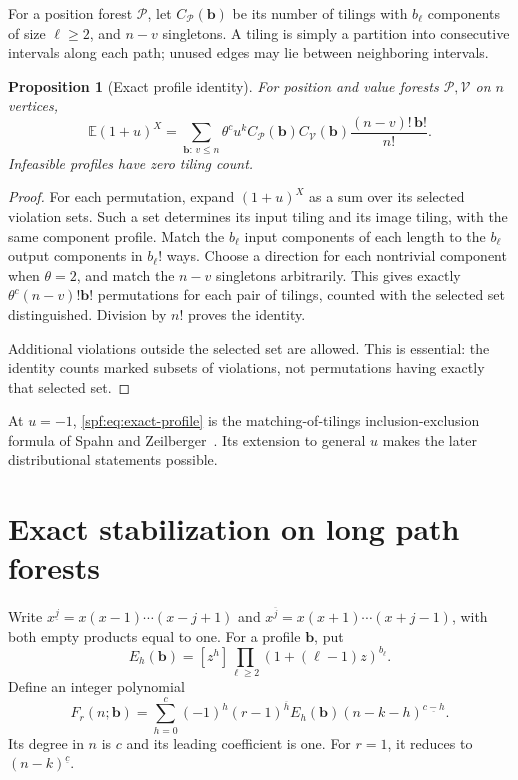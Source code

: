 \documentclass[11pt]{article}
\numberwithin{equation}{section}
\newtheorem{proposition}[theorem]{Proposition}
\theoremstyle{definition}
\theoremstyle{remark}
\theoremstyle{definition}
\newcommand{\E}{\mathbb E}
\newcommand{\fall}[2]{{#1}^{\underline{#2}}}
\newcommand{\rise}[2]{{#1}^{\overline{#2}}}
\newcommand{\bfac}{\mathbf b!}
\begin{document}
For a position forest $\mathcal P$, let $C_{\mathcal P}(\mathbf b)$ be its
number of tilings with $b_\ell$ components of size $\ell\ge2$, and $n-v$
singletons. A tiling is simply a partition into consecutive intervals along
each path; unused edges may lie between neighboring intervals.

\begin{proposition}[Exact profile identity]
\label{spf:prop:exact}
For position and value forests $\mathcal P,\mathcal V$ on $n$ vertices,
\begin{equation}
 \E(1+u)^X
 =\sum_{\mathbf b:\,v\le n}
    \theta^c u^k C_{\mathcal P}(\mathbf b)C_{\mathcal V}(\mathbf b)
    \frac{(n-v)!\,\bfac}{n!}.
 \label{spf:eq:exact-profile}
\end{equation}
Infeasible profiles have zero tiling count.
\end{proposition}
\begin{proof}
For each permutation, expand $(1+u)^X$ as a sum over its selected violation
sets. Such a set determines its input tiling and its image tiling, with the
same component profile. Match the $b_\ell$ input components of each length to
the $b_\ell$ output components in $b_\ell!$ ways. Choose a direction for each
nontrivial component when $\theta=2$, and match the $n-v$ singletons
arbitrarily. This gives exactly
$\theta^c(n-v)!\bfac$ permutations for each pair of tilings, counted with the
selected set distinguished. Division by $n!$ proves the identity.

Additional violations outside the selected set are allowed. This is essential:
the identity counts marked subsets of violations, not permutations having
exactly that selected set.
\end{proof}

At $u=-1$, \eqref{spf:eq:exact-profile} is the matching-of-tilings
inclusion-exclusion formula of Spahn and Zeilberger~\cite{spahn}. Its extension
to general $u$ makes the later distributional statements possible.

\section{Exact stabilization on long path forests}
\label{spf:sec:stable}

Write $\fall{x}{j}=x(x-1)\cdots(x-j+1)$ and
$\rise{x}{j}=x(x+1)\cdots(x+j-1)$, with both empty products equal to one.
For a profile $\mathbf b$, put
\begin{equation}
 E_h(\mathbf b)=[z^h]\prod_{\ell\ge2}(1+(\ell-1)z)^{b_\ell}.
 \label{spf:eq:E}
\end{equation}
Define an integer polynomial
\begin{equation}
 F_r(n;\mathbf b)=
 \sum_{h=0}^{c}(-1)^h\rise{(r-1)}{h}E_h(\mathbf b)
                   \fall{(n-k-h)}{c-h}.
 \label{spf:eq:F}
\end{equation}
Its degree in $n$ is $c$ and its leading coefficient is one. For $r=1$, it
reduces to $\fall{(n-k)}c$.
\end{document}
